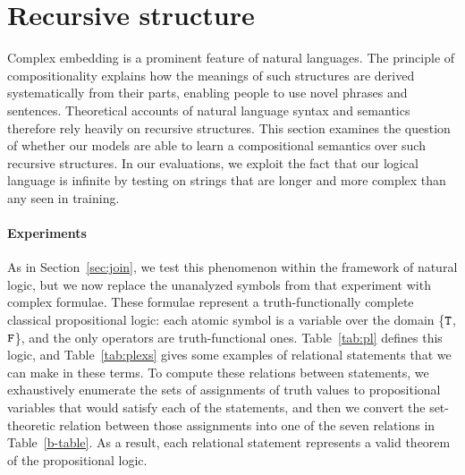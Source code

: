 \section{Recursive structure}\label{sec:recursion}

Complex embedding is a prominent feature of natural languages. 
The principle of compositionality explains how the meanings of 
such structures are derived systematically from their parts,
 enabling people to use novel phrases and sentences.
Theoretical accounts of natural language syntax and semantics
therefore rely heavily on recursive structures. This section examines the 
question of whether our models are able to learn a 
compositional semantics over such recursive structures.
In our evaluations, we exploit the fact that our logical language
is infinite by testing on strings that are longer and more complex
than any seen in training.


\paragraph{Experiments}
As in Section~\ref{sec:join}, we test this phenomenon within the
framework of natural logic, but we now replace the unanalyzed symbols
from that experiment with complex formulae. These formulae
represent a truth-functionally complete classical propositional logic:
each atomic symbol is a variable over the domain \{$\texttt{T}$, $\texttt{F}$\}, and the only
operators are truth-functional ones.  Table~\ref{tab:pl} defines this
logic, and Table~\ref{tab:plexs} gives some examples of relational
statements that we can make in these terms. To compute these relations
between statements, we exhaustively enumerate the sets of assignments
of truth values to propositional variables that would satisfy each of
the statements, and then we convert the set-theoretic relation between
those assignments into one of the seven relations in
Table~\ref{b-table}. As a result, each relational statement represents
a valid theorem of the propositional logic.

